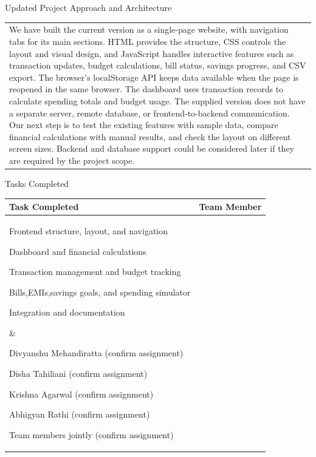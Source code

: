 \documentclass[12pt,a4paper]{article}
\newcommand{\sectiontitle}[1]{%
    {\color{GEUBlue}
    \fontsize{18}{22}\selectfont #1}
}
\newcommand{\answerbox}[2]{%
    \begin{tabularx}{\textwidth}{
        |>{\raggedright\arraybackslash}X|}
        \hline
        \parbox[t][#1][t]{\dimexpr\linewidth-12pt\relax}{
            \vspace{5pt}
            \fontsize{11}{13}\selectfont #2
        }\\
        \hline
    \end{tabularx}
}
\begin{document}
\vspace{1.70cm}

\sectiontitle{Updated Project Approach and Architecture}

\vspace{0.25cm}

\answerbox{4.50cm}{We have built the current version as a single-page website, with navigation tabs for its main sections. HTML provides the
structure, CSS controls the layout and visual design, and JavaScript handles interactive features such as transaction
updates, budget calculations, bill status, savings progress, and CSV export. The browser's localStorage API keeps data
available when the page is reopened in the same browser. The dashboard uses transaction records to calculate spending
totals and budget usage. The supplied version does not have a separate server, remote database, or frontend-to-backend
communication. Our next step is to test the existing features with sample data, compare financial calculations with manual
results, and check the layout on different screen sizes. Backend and database support could be considered later if they are
required by the project scope.}

\vspace{1.70cm}

\sectiontitle{Tasks Completed}

\vspace{0.20cm}

\begin{tabularx}{\textwidth}{
|>{\raggedright\arraybackslash}X
|>{\raggedright\arraybackslash}X|
}
\hline
\textbf{Task Completed} &
\textbf{Team Member}\\
\hline

\parbox[t][3.50cm][t]{\linewidth}{
\begin{compresslist}
    \item Frontend structure, layout, and navigation
    \item Dashboard and financial calculations
    \item Transaction management and budget tracking
    \item Bills,EMIs,savings goals, and spending simulator
    \item Integration and documentation
\end{compresslist} 
}
&
\parbox[t][3.25cm][t]{\linewidth}{
\begin{compresslist}
    \item Divyanshu Mehandiratta (confirm assignment)
    \item Disha Tahiliani (confirm assignment)
    \item Krishna Agarwal (confirm assignment)
    \item Abhigyan Rathi (confirm assignment)
    \item Team members jointly (confirm assignment)
\end{compresslist} 
}
\\
\hline
\end{tabularx}
\end{document}
